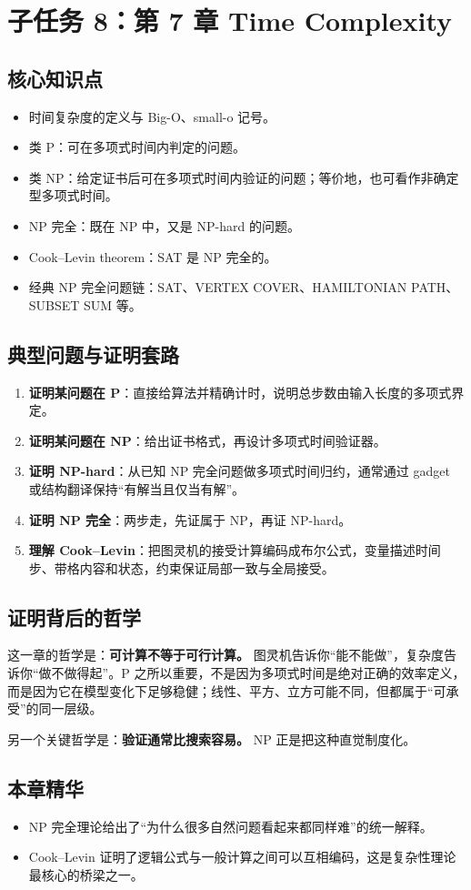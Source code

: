\section{子任务 8：第 7 章 Time Complexity}

\subsection{核心知识点}

\begin{itemize}[leftmargin=2em]
  \item 时间复杂度的定义与 Big-O、small-o 记号。
  \item 类 P：可在多项式时间内判定的问题。
  \item 类 NP：给定证书后可在多项式时间内验证的问题；等价地，也可看作非确定型多项式时间。
  \item NP 完全：既在 NP 中，又是 NP-hard 的问题。
  \item Cook--Levin theorem：SAT 是 NP 完全的。
  \item 经典 NP 完全问题链：SAT、VERTEX COVER、HAMILTONIAN PATH、SUBSET SUM 等。
\end{itemize}

\subsection{典型问题与证明套路}

\begin{enumerate}[leftmargin=2em]
  \item \textbf{证明某问题在 P}：直接给算法并精确计时，说明总步数由输入长度的多项式界定。
  \item \textbf{证明某问题在 NP}：给出证书格式，再设计多项式时间验证器。
  \item \textbf{证明 NP-hard}：从已知 NP 完全问题做多项式时间归约，通常通过 gadget 或结构翻译保持“有解当且仅当有解”。
  \item \textbf{证明 NP 完全}：两步走，先证属于 NP，再证 NP-hard。
  \item \textbf{理解 Cook--Levin}：把图灵机的接受计算编码成布尔公式，变量描述时间步、带格内容和状态，约束保证局部一致与全局接受。
\end{enumerate}

\subsection{证明背后的哲学}

这一章的哲学是：\textbf{可计算不等于可行计算。}
图灵机告诉你“能不能做”，复杂度告诉你“做不做得起”。P 之所以重要，不是因为多项式时间是绝对正确的效率定义，而是因为它在模型变化下足够稳健；线性、平方、立方可能不同，但都属于“可承受”的同一层级。

另一个关键哲学是：\textbf{验证通常比搜索容易。} NP 正是把这种直觉制度化。

\subsection{本章精华}

\begin{itemize}[leftmargin=2em]
  \item NP 完全理论给出了“为什么很多自然问题看起来都同样难”的统一解释。
  \item Cook--Levin 证明了逻辑公式与一般计算之间可以互相编码，这是复杂性理论最核心的桥梁之一。
\end{itemize}

\newpage
